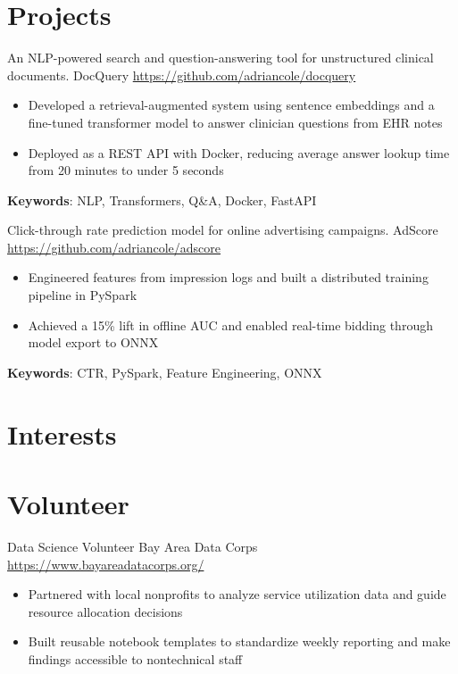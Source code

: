 \documentclass[a4paper, serif, 10pt]{moderncv}
\begin{document}
\section{Projects}

        {An NLP-powered search and question-answering tool for unstructured clinical documents.}
        {DocQuery}
        {\url{https://github.com/adriancole/docquery}}
        {}
        {\begin{itemize}
\item Developed a retrieval-augmented system using sentence embeddings and a fine-tuned transformer model to answer clinician questions from EHR notes
\item Deployed as a REST API with Docker, reducing average answer lookup time from 20 minutes to under 5 seconds
\end{itemize}
\textbf{Keywords}: NLP, Transformers, Q\&A, Docker, FastAPI}

        {Click-through rate prediction model for online advertising campaigns.}
        {AdScore}
        {\url{https://github.com/adriancole/adscore}}
        {}
        {\begin{itemize}
\item Engineered features from impression logs and built a distributed training pipeline in PySpark
\item Achieved a 15\% lift in offline AUC and enabled real-time bidding through model export to ONNX
\end{itemize}
\textbf{Keywords}: CTR, PySpark, Feature Engineering, ONNX}
\section{Interests}

\section{Volunteer}

        {Data Science Volunteer}
        {Bay Area Data Corps}
        {\url{https://www.bayareadatacorps.org/}}
        {}
        {\begin{itemize}
\item Partnered with local nonprofits to analyze service utilization data and guide resource allocation decisions
\item Built reusable notebook templates to standardize weekly reporting and make findings accessible to nontechnical staff
\end{itemize}}
    
\end{document}
